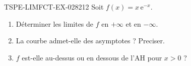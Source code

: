 \begin{exercice}{TSPE-LIMFCT-EX-028}{2}{12}
Soit $f(x) = x\,\mathrm{e}^{-x}$.
\begin{enumerate}
  \item Déterminer les limites de $f$ en $+\infty$ et en $-\infty$.
  \item La courbe admet-elle des asymptotes ? Preciser.
  \item $f$ est-elle au-dessus ou en dessous de l'AH pour $x > 0$ ?
\end{enumerate}
\end{exercice}
